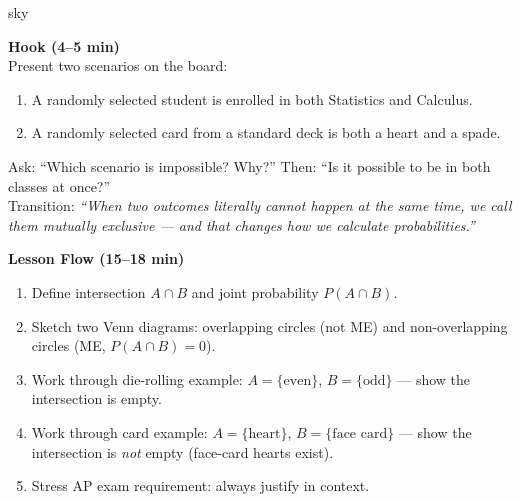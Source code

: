 \documentclass[10pt]{article}
\begin{document}
\begin{skillbox}{sky}
\begin{minipage}[t]{0.48\linewidth}
    \textbf{Hook (4--5 min)}\\
    Present two scenarios on the board:
    \begin{enumerate}
        \item A randomly selected student is enrolled in both Statistics and Calculus.
        \item A randomly selected card from a standard deck is both a heart and a spade.
    \end{enumerate}
    Ask: ``Which scenario is impossible? Why?'' Then: ``Is it possible to be in
    both classes at once?''\\[4pt]
    Transition: \textit{``When two outcomes literally cannot happen at the same time,
    we call them mutually exclusive --- and that changes how we calculate probabilities.''}
\end{minipage}
\hfill
\begin{minipage}[t]{0.48\linewidth}
    \textbf{Lesson Flow (15--18 min)}
    \begin{enumerate}
        \item Define intersection $A \cap B$ and joint probability $P(A \cap B)$.
        \item Sketch two Venn diagrams: overlapping circles (not ME) and
              non-overlapping circles (ME, $P(A \cap B) = 0$).
        \item Work through die-rolling example: $A = \{\text{even}\}$,
              $B = \{\text{odd}\}$ --- show the intersection is empty.
        \item Work through card example: $A = \{\text{heart}\}$, $B = \{\text{face card}\}$
              --- show the intersection is \emph{not} empty (face-card hearts exist).
        \item Stress AP exam requirement: always justify in context.
    \end{enumerate}
\end{minipage}
\end{skillbox}
\end{document}
